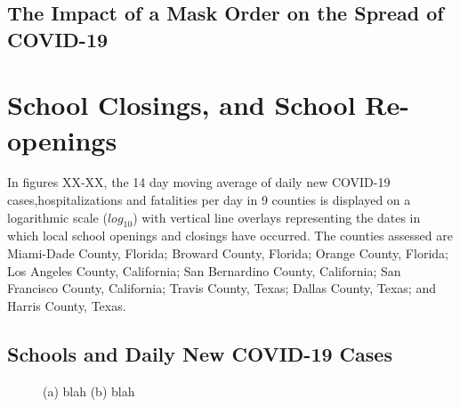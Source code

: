 \documentclass[]{article}
\begin{document}
\subsection{The Impact of a Mask Order on the Spread of COVID-19}

\FloatBarrier
\vspace{5mm}
\section{School Closings, and School Re-openings}

In figures XX-XX, the 14 day moving average of daily new COVID-19 cases,hospitalizations and fatalities per day in 9 counties is displayed on a logarithmic scale ($log_{10}$) with vertical line overlays representing the dates in which local school openings and closings have occurred. The counties assessed are Miami-Dade County, Florida; Broward County, Florida; Orange County, Florida; Los Angeles County, California; San Bernardino County, California; San Francisco County, California; Travis County, Texas; Dallas County, Texas; and Harris County, Texas.

\subsection{Schools and Daily New COVID-19 Cases}

\begin{figure}
	\centering
	\caption{(a) blah (b) blah}
	\label{fig:foobar}
\end{figure}
\end{document}

